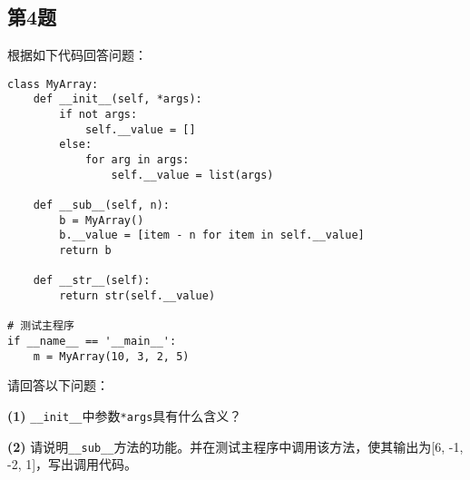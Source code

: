 \subsection{第4题}
根据如下代码回答问题：
\begin{lstlisting}
class MyArray:
    def __init__(self, *args):
        if not args:
            self.__value = []
        else:
            for arg in args:
                self.__value = list(args)

    def __sub__(self, n):
        b = MyArray()
        b.__value = [item - n for item in self.__value]
        return b

    def __str__(self):
        return str(self.__value)

# 测试主程序
if __name__ == '__main__':
    m = MyArray(10, 3, 2, 5)
\end{lstlisting}

请回答以下问题：

\textbf{(1)} \texttt{\_\_init\_\_}中参数\texttt{*args}具有什么含义？

\textbf{(2)} 请说明\texttt{\_\_sub\_\_}方法的功能。并在测试主程序中调用该方法，使其输出为[6, -1, -2, 1]，写出调用代码。

